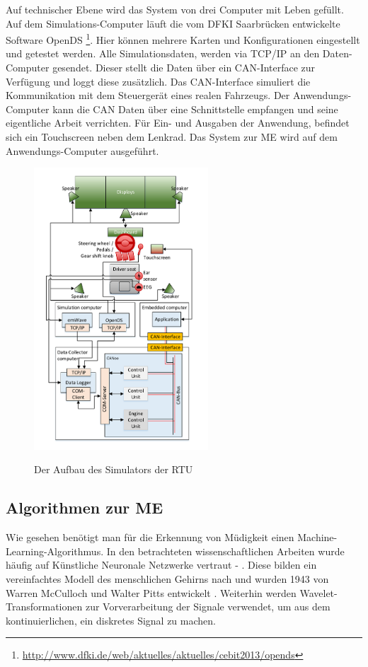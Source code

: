 {Auf technischer Ebene wird das System von drei Computer mit Leben gefüllt. Auf dem Simulations-Computer läuft die vom DFKI Saarbrücken entwickelte Software OpenDS \footnote{\url{http://www.dfki.de/web/aktuelles/aktuelles/cebit2013/opends}}. Hier können mehrere Karten und Konfigurationen eingestellt und getestet werden. Alle Simulationsdaten, werden via TCP/IP an den Daten-Computer gesendet. Dieser stellt die Daten über ein CAN-Interface zur Verfügung und loggt diese zusätzlich. Das CAN-Interface simuliert die Kommunikation mit dem Steuergerät eines realen Fahrzeugs. Der Anwendungs-Computer kann die CAN Daten über eine Schnittstelle empfangen und seine eigentliche Arbeit verrichten. Für Ein- und Ausgaben der Anwendung, befindet sich ein Touchscreen neben dem Lenkrad. Das System zur \acl{ME} wird auf dem Anwendungs-Computer ausgeführt.
\begin{figure}[h] 
  \begin{center}
    \includegraphics[width=6.5cm]{img/architecture}
    \label{fig:architecure}
    \caption[Aufbau des Simulators]{Der Aufbau des Simulators der \acl{RTU}}
  \end{center}
\end{figure}

\subsection{Algorithmen zur \acl{ME}}
Wie gesehen benötigt man für die Erkennung von Müdigkeit einen Machine-Learning-Algorithmus. In den betrachteten wissenschaftlichen Arbeiten wurde häufig auf Künstliche Neuronale Netzwerke vertraut \cite{wilson_890161} - \cite{Murthy_1}. Diese bilden ein vereinfachtes Modell des menschlichen Gehirns nach und wurden 1943 von Warren McCulloch und Walter Pitts entwickelt \cite{ann}.
Weiterhin werden Wavelet-Transformationen \cite{Chui:1992:IW:163196} zur Vorverarbeitung der Signale verwendet, um aus dem kontinuierlichen, ein diskretes Signal zu machen.

}
